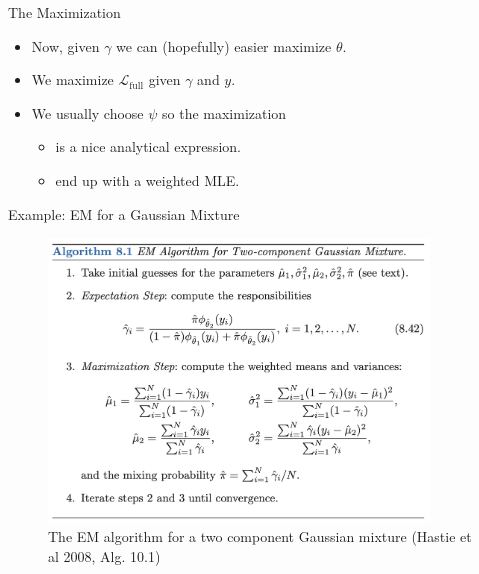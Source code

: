 \documentclass[10pt]{beamer}
\begin{document}
\begin{frame}{The Maximization}

\begin{itemize}
\item Now, given $\gamma$ we can (hopefully) easier maximize $\theta$.\pause
\item We maximize $\mathcal{L}_{\text{full}}$ given $\gamma$ and $y$.\pause
\item We usually choose $\psi$ so the maximization
\begin{itemize}
\item is a nice analytical expression.
\item end up with a weighted MLE.
\end{itemize}

\end{itemize}



\end{frame}

\begin{frame}{Example: EM for a Gaussian Mixture}

\begin{figure}[h]
\centering
\includegraphics[width=0.9\textwidth]{fig/algo_8_1_em_gaussian.png}
\caption{The EM algorithm for a two component Gaussian mixture (Hastie et al 2008, Alg. 10.1)}
\end{figure}

\end{frame}
\end{document}
